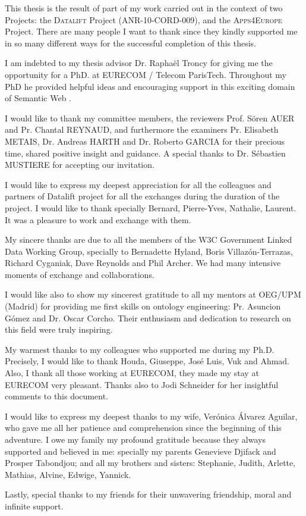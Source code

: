 
This thesis is the result of part of my work carried out in the context of two Projects: the \textsc{Datalift} Project (ANR-10-CORD-009), and the \textsc{Apps4Europe} Project. 
There are many people I want to thank since they kindly supported me in so many different ways for the successful completion of this thesis.


I am indebted to my thesis advisor Dr. Rapha\"{e}l Troncy for giving me the opportunity for a PhD. at EURECOM / Telecom ParisTech. Throughout my PhD  he provided helpful ideas and encouraging support in this exciting domain of Semantic Web . 

I would like to thank my committee members, the reviewers Prof. S\"{o}ren AUER  and Pr. Chantal REYNAUD, and furthermore the examiners Pr. Elisabeth METAIS, Dr. Andreas HARTH  and Dr. Roberto GARCIA for their precious time, shared positive insight and guidance. A special thanks to Dr. S\'{e}bastien MUSTIERE for accepting our invitation.

I would like to express my deepest appreciation for all the colleagues and partners of Datalift project for all the exchanges during the duration of the project. I would like to thank specially Bernard, Pierre-Yves, Nathalie, Laurent. It was a pleasure to work and exchange with them.

My sincere thanks are due to all the members of the W3C Government Linked Data Working Group, specially to Bernadette Hyland, Boris Villaz\'{o}n-Terrazas, Richard Cyganiak, Dave Reynolds and Phil Archer. We had many intensive moments of exchange and collaborations.

I would like also to show my sincerest gratitude to all my mentors at OEG/UPM (Madrid) for providing me first skills on ontology engineering: Pr. Asuncion G\'{o}mez and Dr. Oscar Corcho. Their enthusiasm and dedication to research on this field were truly inspiring.

My warmest thanks to my colleagues who supported me during my Ph.D. Precisely, I would like to thank Houda, Giuseppe, Jos\'{e} Luis, Vuk and Ahmad. Also, I thank all those working at EURECOM, they made my stay at EURECOM very pleasant. Thanks also to Jodi Schneider for her insightful comments to this document. 

I would like to express my deepest thanks to my wife, Ver\'{o}nica \'{A}lvarez Aguilar, who gave me all her patience and comprehension since the beginning of this adventure. 
I owe my family my profound gratitude because they
always supported and believed in me: specially my parents Genevieve Djifack and Prosper Tabondjou; and all my brothers and sisters: Stephanie, Judith, Arlette, Mathias, Alvine, Edwige, Yannick.

Lastly, special thanks to my friends for their unwavering friendship, moral and infinite support.


 

